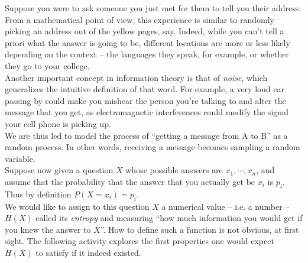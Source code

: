  \vspace{0.2cm}


Suppose you were to ask someone you just met for them to tell you their address. From a mathematical point of view, this experience is similar to randomly picking an address out of the yellow pages, say. Indeed, while you can't tell a priori what the answer is going to be, different locations are more or less likely depending on the context -- the languages they speak, for example, or whether they go to your college. \\

Another important concept in information theory is that of \emph{noise}, which generalizes the intuitive definition of that word. For example, a very loud car passing by could make you mishear the person you're talking to and alter the message that you get, as electromagnetic interferences could modify the signal your cell phone is picking up. \\

We are thus led to model the process of ``getting a message from A to B'' as a random process. In other words, receiving a message becomes sampling a random variable. \\

Suppose now given a question $X$ whose possible answers are $x_1,\cdots,x_n$, and assume that the probability that the answer that you actually get be $x_i$ is $p_i$. Thus by definition $P(X = x_i)=p_i$. \\

We would like to assign to this question $X$ a numerical value -- i.e. a number -- $H(X)$ called its \emph{entropy} and measuring ``how much information you would get if you knew the answer to $X$''. How to define such a function is not obvious, at first sight. The following activity explores the first properties one would expect $H(X)$ to satisfy if it indeed existed. \\

